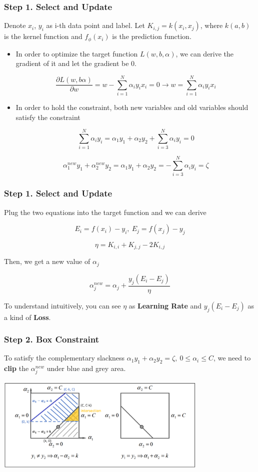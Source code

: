 \documentclass[xcolor=pdftex,dvipsnames,table,handout]{beamer}
\begin{document}
\begin{frame}  
\frametitle{Step 1. Select and Update}
Denote $x_i$, $y_i$ as i-th data point and label. Let $K_{i, j} = k(x_i, x_j)$, where $k(a, b)$ is the kernel function and $f_{\phi}(x_i)$ is the prediction function.

\begin{itemize}[<+->]

\item In order to optimize the target function $L(w, b, \alpha)$, we can derive the gradient of it and let the gradient be 0.

$$
\frac{\partial L(w, b \alpha)}{\partial w} = w - \sum_{i=1}^N \alpha_i y_i x_i = 0 \to w = \sum_{i=1}^N \alpha_i y_i x_i
$$

\item In order to hold the constraint, both new variables and old variables should satisfy the constraint

$$
\sum_{i=1}^{N} \alpha_i y_i = \alpha_1 y_1 + \alpha_2 y_2 + \sum_{i=3}^{N} \alpha_i y_i = 0
$$

$$
\alpha_1^{new} y_1 + \alpha_2^{new} y_2 = \alpha_1 y_1 + \alpha_2 y_2 = - \sum_{i=3}^{N} \alpha_i y_i = \zeta
$$

\end{itemize}

\end{frame}

\begin{frame}  
\frametitle{Step 1. Select and Update}
Plug the two equations into the target function and we can derive 

$$E_i = f(x_i) - y_i, \ E_j = f(x_j) - y_j$$

$$\eta = K_{i, i} + K_{j, j} -  2 K_{i, j}$$

Then, we get a new value of $\alpha_j$

$$\alpha_j^{new} = \alpha_j + \frac{y_j (E_i - E_j)}{\eta}$$

To understand intuitively, you can see $\eta$ as \textbf{Learning Rate} and $y_j (E_i - E_j)$ as a kind of \textbf{Loss}.
\end{frame}

\begin{frame}  
\frametitle{Step 2. Box Constraint}
To satisfy the complementary slackness $\alpha_1 y_1 + \alpha_2 y_2  = \zeta, \ 0 \leq \alpha_i \leq C$, we need to \textbf{clip} the $\alpha_j^{new}$ under blue and grey area.

\includegraphics[width=4in]{./imgs/box.png}
\end{frame}
\end{document}
